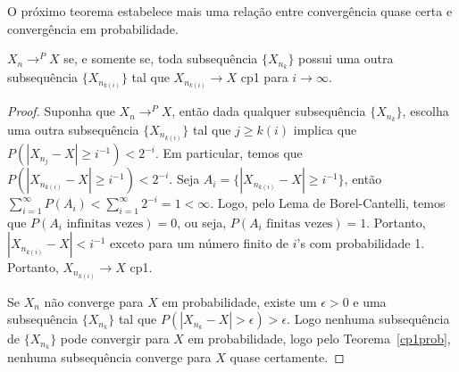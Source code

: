 \begin{frame}
%
%
O próximo teorema estabelece mais uma relação entre convergência
quase certa e convergência em probabilidade.
%
\begin{teo}
$X_n\rightarrow^P X$ se, e somente se, toda subsequência
$\{X_{n_k}\}$ possui uma outra subsequência $\{X_{n_{k(i)}}\}$ tal
que $X_{n_{k(i)}}\rightarrow X$ cp1 para $i\rightarrow\infty$.
\end{teo}
%
%
%
%
\begin{proof} Suponha que $X_n\rightarrow^P X$, então dada qualquer
subsequência $\{X_{n_k}\}$, escolha uma outra subsequência
$\{X_{n_{k(i)}}\}$ tal que $j\geq k(i)$ implica que
$P(|X_{n_{j}}-X|\geq i^{-1})<2^{-i}$. Em particular, temos que
$P(|X_{n_{k(i)}}-X|\geq i^{-1})<2^{-i}$. Seja
$A_i=\{|X_{n_{k(i)}}-X|\geq i^{-1}\}$, então
$\sum_{i=1}^{\infty}P(A_i)<\sum_{i=1}^{\infty}2^{-i}=1<\infty$.
Logo, pelo Lema de Borel-Cantelli, temos que $P(A_i\mbox{ infinitas
vezes})=0$, ou seja, $P(A_i\mbox{ finitas vezes})=1$. Portanto,
$|X_{n_{k(i)}}-X|< i^{-1}$ exceto para um número finito de $i$'s com
probabilidade 1. Portanto, $X_{n_{k(i)}}\rightarrow X$ cp1.

Se $X_n$ não converge para $X$ em probabilidade, existe um
$\epsilon>0$ e uma subsequência $\{X_{n_k}\}$ tal que
$P(|X_{n_k}-X|>\epsilon)>\epsilon$. Logo nenhuma subsequência de
$\{X_{n_k}\}$ pode convergir para $X$ em probabilidade, logo pelo
Teorema~\ref{cp1prob}, nenhuma subsequência converge para $X$ quase
certamente. \end{proof}
%
\end{frame}
%
